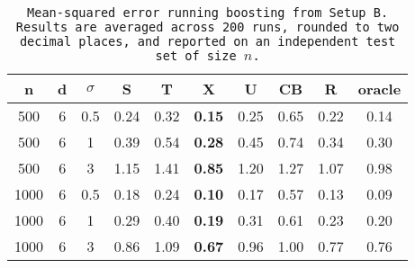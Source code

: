 \begin{table}[ht]
\centering
\begin{tabular}{cccccccccc}
  \hline
n & d & $\sigma$ & S & T & X & U & CB & R & oracle \\ 
  \hline
500 & 6 & 0.5 & 0.24 & 0.32 & \bf 0.15 & 0.25 & 0.65 & 0.22 & 0.14 \\ 
  500 & 6 & 1 & 0.39 & 0.54 & \bf 0.28 & 0.45 & 0.74 & 0.34 & 0.30 \\ 
  500 & 6 & 3 & 1.15 & 1.41 & \bf 0.85 & 1.20 & 1.27 & 1.07 & 0.98 \\ 
  1000 & 6 & 0.5 & 0.18 & 0.24 & \bf 0.10 & 0.17 & 0.57 & 0.13 & 0.09 \\ 
  1000 & 6 & 1 & 0.29 & 0.40 & \bf 0.19 & 0.31 & 0.61 & 0.23 & 0.20 \\ 
  1000 & 6 & 3 & 0.86 & 1.09 & \bf 0.67 & 0.96 & 1.00 & 0.77 & 0.76 \\ 
   \hline
\end{tabular}
\caption{\tt Mean-squared error running \texttt{boosting} from Setup B. Results are averaged across 200 runs, rounded to two decimal places, and reported on an independent test set of size $n$.} 
\label{table:setup2}
\end{table}
